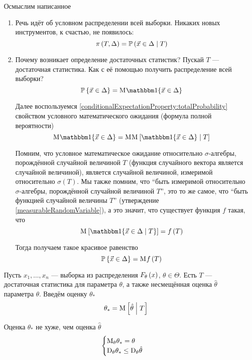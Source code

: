 Осмыслим написанное
\begin{enumerate}
    \item Речь идёт об условном распределении всей выборки.
        Никаких новых инструментов, к счастью, не появилось:
        $$\pi\left( T, \Delta \right)
            = \mathbb{P}\left( \vec{x} \in \Delta \;\middle|\; T \right)$$
    \item Почему возникает определение достаточных статистик?
        Пускай $T$ --- достаточная статистика.
        Как с её помощью получить распределение всей выборки?
        $$\Probability{\vec{x} \in \Delta}
            = \mean{\Indicator{\vec{x} \in \Delta}}$$

        Далее воспользуемся
        \ref{conditionalExpectationProperty:totalProbability}
        свойством условного математического ожидания
        (формула полной вероятности)
        $$\mean{\Indicator{\vec{x} \in \Delta}}
            = \mean{\Mean{\Indicator{\vec{x} \in \Delta} \mcond T}}$$

        Помним, что условное математическое ожидание
        относительно $\sigma$-алгебры, порождённой случайной величиной $T$
        (функция случайного вектора является случайной величиной),
        является случайной величиной, измеримой
        относительно $\sigma\left( T \right)$.
        Мы также помним, что ``быть измеримой относительно $\sigma$-алгебры,
        порождённой случайной величиной $T$'', это то же самое, что
        ``быть функцией случайной величины $T$''
        (утверждение \ref{measurableRandomVariable}), а это значит,
        что существует функция $f$ такая, что
        $$\Mean{\Indicator{\vec{x} \in \Delta \mcond T}} = f\left( T \right)$$

        Тогда получаем такое красивое равенство
        $$\mathbb{P}\left\{ \vec{x} \in \Delta \right\} = \mathrm{M}_{} f\left( T \right)$$
\end{enumerate}

\begin{theorem}
    Пусть $x_1, \dots, x_n$ --- выборка из распределения $F_{\theta}\left(x\right)$,
    $\theta \in \Theta$.
    Есть $T$ --- достаточная статистика для параметра $\theta$,
    а также несмещённая оценка $\hat{\theta}$ параметра $\theta$.
    Введём оценку $\theta_*$
    $$\theta_* = \mathrm{M}_{} \left[ \hat{\theta} \;\middle|\; T \right]$$

    Оценка $\theta_*$ не хуже, чем оценка $\hat{\theta}$
    $$\begin{cases}
        \mathrm{M}_{\theta} \theta_* = \theta \\
        \mathrm{D}_{\theta} \theta_* \le \mathrm{D}_{\theta} \hat{\theta}
    \end{cases}$$
\end{theorem}


